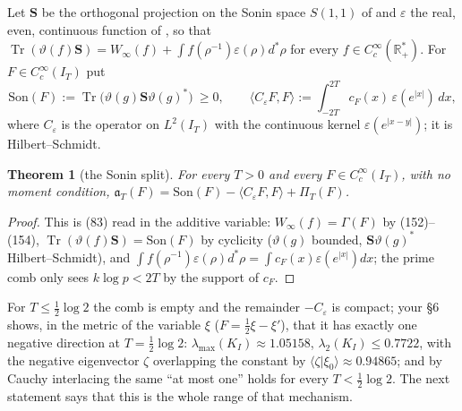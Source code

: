 \documentclass[11pt]{amsart}
\newtheorem{theorem}{Theorem}[section]
\theoremstyle{definition}
\theoremstyle{remark}
\newcommand{\R}{\mathbb R}
\newcommand{\Tr}{\operatorname{Tr}}
\newcommand{\IT}{I_T}
\newcommand{\cF}{c_F}
\newcommand{\PiT}{\Pi_T}
\newcommand{\Son}{\mathrm{Son}}
\begin{document}
Let $\mathbf S$ be the orthogonal projection on the Sonin space $S(1,1)$ of \cite[Def.~4.4]{CC2021} and
$\varepsilon$ the real, even, continuous function of \cite[Thm.~4.7, (83)--(84)]{CC2021}, so that
$\Tr(\vartheta(f)\mathbf S)=W_\infty(f)+\int f(\rho^{-1})\varepsilon(\rho)d^*\rho$ for every
$f\in C_c^\infty(\R_+^*)$. For $F\in C_c^\infty(\IT)$ put
\[
\Son(F):=\Tr\big(\vartheta(g)\mathbf S\vartheta(g)^*\big)\ \ge0,\qquad
\langle C_\varepsilon F,F\rangle:=\int_{-2T}^{2T}\cF(x)\,\varepsilon(e^{|x|})\,dx ,
\]
where $C_\varepsilon$ is the operator on $L^2(\IT)$ with the continuous kernel $\varepsilon(e^{|x-y|})$; it is
Hilbert--Schmidt.

\begin{theorem}[the Sonin split]\label{thm:split}
For every $T>0$ and every $F\in C_c^\infty(\IT)$, with no moment condition,
$\mathfrak a_T(F)=\Son(F)-\langle C_\varepsilon F,F\rangle+\PiT(F)$.
\end{theorem}
\begin{proof}
This is (83) read in the additive variable: $W_\infty(f)=\Gamma(F)$ by (152)--(154), $\Tr(\vartheta(f)\mathbf S)=\Son(F)$ by
cyclicity ($\vartheta(g)$ bounded, $\mathbf S\vartheta(g)^*$ Hilbert--Schmidt), and
$\int f(\rho^{-1})\varepsilon(\rho)d^*\rho=\int\cF(x)\varepsilon(e^{|x|})dx$; the prime comb only sees $k\log p<2T$ by the
support of $\cF$.
\end{proof}

For $T\le\frac12\log2$ the comb is empty and the remainder $-C_\varepsilon$ is compact; your \S6 shows, in the
metric of the variable $\xi$ ($F=\frac12\xi-\xi'$), that it has exactly one negative direction at $T=\frac12\log2$:
$\lambda_{\max}(K_I)\approx1.05158$, $\lambda_2(K_I)\le0.7722$, with the negative eigenvector $\zeta$ overlapping
the constant by $\langle\zeta|\xi_0\rangle\approx0.94865$; and by Cauchy interlacing the same ``at most one''
holds for every $T<\frac12\log2$. The next statement says that this is the whole range of that mechanism.
\end{document}
